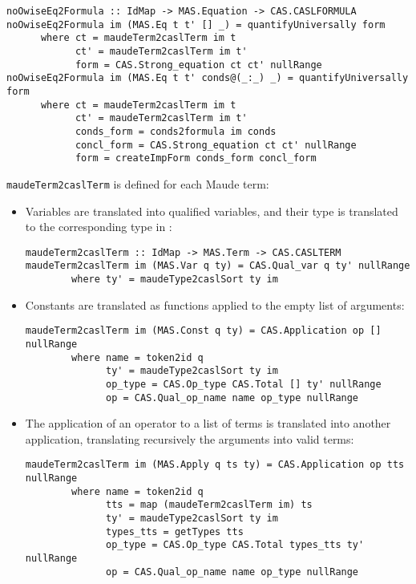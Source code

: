 {\codesize
\begin{verbatim}
noOwiseEq2Formula :: IdMap -> MAS.Equation -> CAS.CASLFORMULA
noOwiseEq2Formula im (MAS.Eq t t' [] _) = quantifyUniversally form
      where ct = maudeTerm2caslTerm im t
            ct' = maudeTerm2caslTerm im t'
            form = CAS.Strong_equation ct ct' nullRange
noOwiseEq2Formula im (MAS.Eq t t' conds@(_:_) _) = quantifyUniversally form
      where ct = maudeTerm2caslTerm im t
            ct' = maudeTerm2caslTerm im t'
            conds_form = conds2formula im conds
            concl_form = CAS.Strong_equation ct ct' nullRange
            form = createImpForm conds_form concl_form
\end{verbatim}
}

\verb"maudeTerm2caslTerm" is defined for each Maude term:

\begin{itemize}

\item Variables are translated into qualified \CASL variables, and their
type is translated to the corresponding type in \CASL:

{\codesize
\begin{verbatim}
maudeTerm2caslTerm :: IdMap -> MAS.Term -> CAS.CASLTERM
maudeTerm2caslTerm im (MAS.Var q ty) = CAS.Qual_var q ty' nullRange
        where ty' = maudeType2caslSort ty im
\end{verbatim}
}

\item Constants are translated as functions applied
to the empty list of arguments:

{\codesize
\begin{verbatim}
maudeTerm2caslTerm im (MAS.Const q ty) = CAS.Application op [] nullRange
        where name = token2id q
              ty' = maudeType2caslSort ty im
              op_type = CAS.Op_type CAS.Total [] ty' nullRange
              op = CAS.Qual_op_name name op_type nullRange
\end{verbatim}
}

\item The application of an operator to a list of terms is translated
into another application, translating recursively the arguments into
valid \CASL terms:

{\codesize
\begin{verbatim}
maudeTerm2caslTerm im (MAS.Apply q ts ty) = CAS.Application op tts nullRange
        where name = token2id q
              tts = map (maudeTerm2caslTerm im) ts
              ty' = maudeType2caslSort ty im
              types_tts = getTypes tts
              op_type = CAS.Op_type CAS.Total types_tts ty' nullRange
              op = CAS.Qual_op_name name op_type nullRange
\end{verbatim}
}

\end{itemize}

